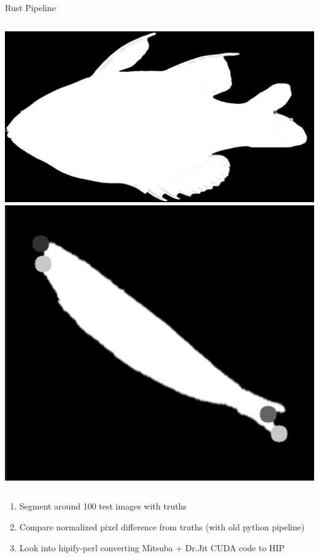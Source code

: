 \begin{frame}{Rust Pipeline}
\begin{columns}[c]
        \centering
        \includegraphics[height=0.45\textheight,keepaspectratio]{./images/img3.png}
        \centering
        \includegraphics[height=0.45\textheight,keepaspectratio]{./images/img2.png}
  \end{columns}
      \begin{enumerate}
        \item Segment around 100 test images with truths
        \item Compare normalized pixel difference from truths (with old python pipeline)
        \item Look into hipify-perl converting Mitsuba + Dr.Jit CUDA code to HIP
    \end{enumerate}
\end{frame}